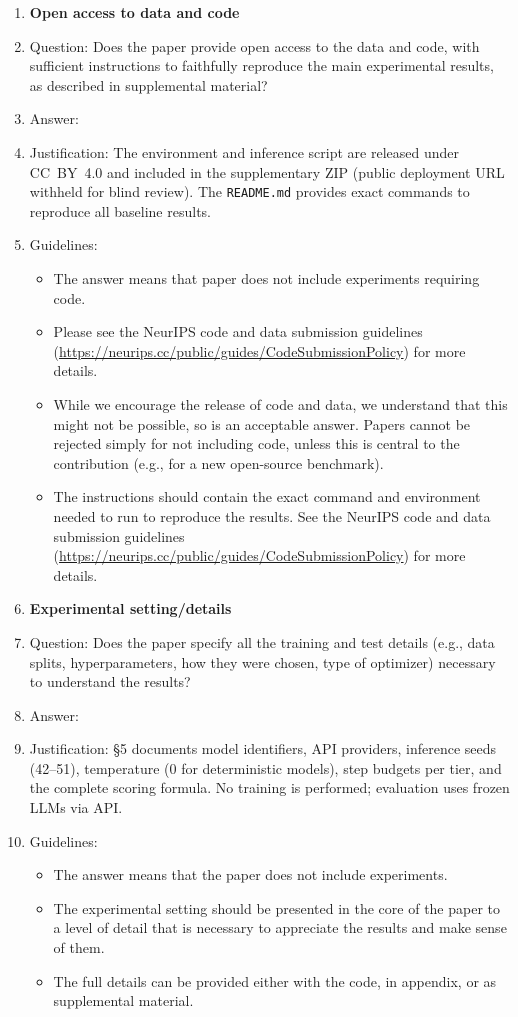 \begin{enumerate}
\item {\bf Open access to data and code}
    \item[] Question: Does the paper provide open access to the data and code, with sufficient instructions to faithfully reproduce the main experimental results, as described in supplemental material?
    \item[] Answer: \answerYes{}
    \item[] Justification: The environment and inference script are released under CC~BY~4.0 and included in the supplementary ZIP (public deployment URL withheld for blind review). The \texttt{README.md} provides exact commands to reproduce all baseline results.
    \item[] Guidelines: \begin{itemize}
        \item The answer \answerNA{} means that paper does not include experiments requiring code.
        \item Please see the NeurIPS code and data submission guidelines (\url{https://neurips.cc/public/guides/CodeSubmissionPolicy}) for more details.
        \item While we encourage the release of code and data, we understand that this might not be possible, so \answerNo{} is an acceptable answer. Papers cannot be rejected simply for not including code, unless this is central to the contribution (e.g., for a new open-source benchmark).
        \item The instructions should contain the exact command and environment needed to run to reproduce the results. See the NeurIPS code and data submission guidelines (\url{https://neurips.cc/public/guides/CodeSubmissionPolicy}) for more details.
    \end{itemize}


\item {\bf Experimental setting/details}
    \item[] Question: Does the paper specify all the training and test details (e.g., data splits, hyperparameters, how they were chosen, type of optimizer) necessary to understand the results?
    \item[] Answer: \answerYes{}
    \item[] Justification: \S5 documents model identifiers, API providers, inference seeds (42--51), temperature (0 for deterministic models), step budgets per tier, and the complete scoring formula. No training is performed; evaluation uses frozen LLMs via API.
    \item[] Guidelines: \begin{itemize}
        \item The answer \answerNA{} means that the paper does not include experiments.
        \item The experimental setting should be presented in the core of the paper to a level of detail that is necessary to appreciate the results and make sense of them.
        \item The full details can be provided either with the code, in appendix, or as supplemental material.
    \end{itemize}


\end{enumerate}

